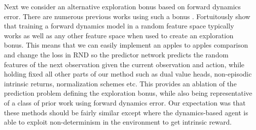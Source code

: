 \documentclass{article} \usepackage[dvipsnames]{xcolor}
\begin{document}
Next we consider an alternative exploration bonus based on forward dynamics error. There are numerous previous works using such a bonus \citep{schmidhuber_curiosity,stadie2015incentivizing,josh_surprise,pathakICMl17curiosity,burda18largescale}. Fortuitously \citet{burda18largescale} show that training a forward dynamics model in a random feature space typically works as well as any other feature space when used to create an exploration bonus. This means that we can easily implement an apples to apples comparison and change the loss in RND so the predictor network predicts the random features of the next observation given the current observation and action, while holding fixed all other parts of our method such as dual value heads, non-episodic intrinsic returns, normalization schemes etc. This provides an ablation of the prediction problem defining the exploration bonus, while also being representative of a class of prior work using forward dynamics error. Our expectation was that these methods should be fairly similar except where the dynamics-based agent is able to exploit non-determinism in the environment to get intrinsic reward.
\end{document}
